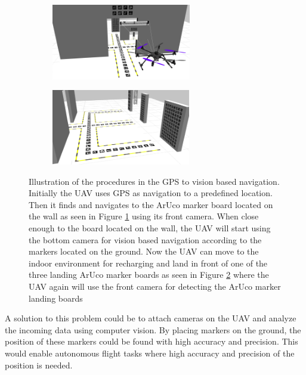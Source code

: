 \documentclass[../Head/report.tex]{subfiles}
\begin{document}
\begin{figure}[H]
    \centering
    \begin{subfigure}[b]{.40\textwidth}
        \centering
        \includegraphics[height=3.3cm]{../Figures/img1.png}
        \caption{}
        \label{fig:gps2vision_step1}
    \end{subfigure}
    \begin{subfigure}[b]{.40\textwidth}
        \centering
        \includegraphics[height=3.3cm]{../Figures/img2.png}
        \caption{}
        \label{fig:gps2vision_step2}
    \end{subfigure}
    \caption{Illustration of the procedures in the GPS to vision based navigation. Initially the UAV uses GPS as navigation to a predefined location. Then it finds and navigates to the ArUco marker board located on the wall as seen in Figure \ref{fig:gps2vision_step1} using its front camera. When close enough to the board located on the wall, the UAV will start using the bottom camera for vision based navigation according to the markers located on the ground. Now the UAV can move to the indoor environment for recharging and land in front of one of the three landing ArUco marker boards as seen in Figure \ref{fig:gps2vision_step2} where the UAV again will use the front camera for detecting the ArUco marker landing boards} 
    \label{fig:gps2vision_steps}
\end{figure}

A solution to this problem could be to attach cameras on the UAV and analyze the incoming data using computer vision. By placing markers on the ground, the position of these markers could be found with high accuracy and precision. This would enable autonomous flight tasks where high accuracy and precision of the position is needed.      
\end{document}
